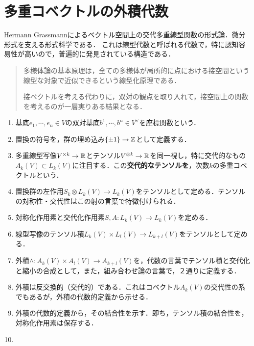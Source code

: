 \documentclass[uplatex,dvipdfmx]{jsreport}
\begin{document}
\section{多重コベクトルの外積代数}

\begin{tcolorbox}[colframe=ForestGreen, colback=ForestGreen!10!white, breakable ,colbacktitle=ForestGreen!40!white, coltitle=black,fonttitle=\bfseries\sffamily,
    title=テンソル代数，外積代数，対称代数．]
    Hermann Grassmannによるベクトル空間上の交代多重線型関数の形式論．微分形式を支える形式科学である．
    これは線型代数と呼ばれる代数で，特に認知容易性が高いので，普遍的に発見されている構造である．
    \begin{quotation}
        多様体論の基本原理は，全ての多様体が局所的に点における接空間という線型な対象で近似できるという線型化原理である．

        接ベクトルを考える代わりに，双対の観点を取り入れて，接空間上の関数を考えるのが一層実りある結果となる．
    \end{quotation}
    \begin{enumerate}
        \item 基底$e_1,\cdots,e_n\in V$の双対基底$b^1,\cdots,b^n\in V^\vee$を座標関数という．
        \item 置換の符号を，群の埋め込み$\{\pm 1\}\to\mathbb{Z}$として定義する．
        \item 多重線型写像$V^{\times k}\to\mathbb{R}$とテンソル$V^{\otimes k}\to\mathbb{R}$を同一視し，特に交代的なもの$A_k(V)\subset L_k(V)$に注目する．この\textbf{交代的なテンソルを}，次数$k$の多重コベクトルという．
        \item 置換群の左作用$S_k\otimes L_k(V)\to L_k(V)$をテンソルとして定める．テンソルの対称性・交代性はこの射の言葉で特徴付けられる．
        \item 対称化作用素と交代化作用素$S,A:L_k(V)\to L_k(V)$を定める．
        \item 線型写像のテンソル積$L_k(V)\times L_l(V)\to L_{k+l}(V)$をテンソルとして定める．
        \item 外積$\wedge:A_k(V)\times A_l(V)\to A_{k+l}(V)$を，代数の言葉でテンソル積と交代化と縮小の合成として，また，組み合わせ論の言葉で，２通りに定義する．
        \item 外積は反交換的（交代的）である．これはコベクトル$A_k(V)$の交代性の系でもあるが，外積の代数的定義から示せる．
        \item 外積の代数的定義から，その結合性を示す．即ち，テンソル積の結合性を，対称化作用素は保存する．
        \item 
    \end{enumerate}
\end{tcolorbox}
\end{document}
